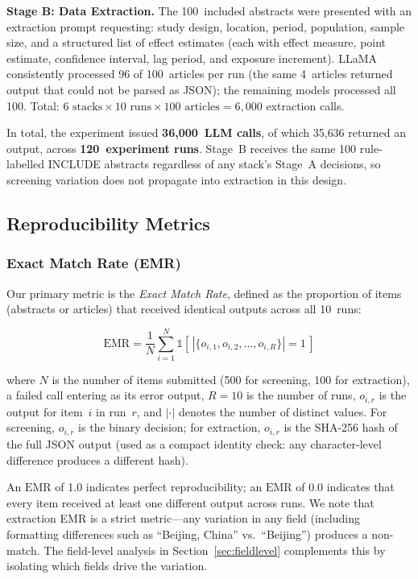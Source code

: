 \documentclass[preprint,review,12pt,authoryear]{elsarticle}
\newcommand{\emr}{\textrm{EMR}}
\begin{document}
\textbf{Stage B: Data Extraction.}
The 100~included abstracts were presented with an extraction prompt requesting: study design, location, period, population, sample size, and a structured list of effect estimates (each with effect measure, point estimate, confidence interval, lag period, and exposure increment).
LLaMA consistently processed 96 of 100~articles per run (the same 4~articles returned output that could not be parsed as JSON); the remaining models processed all 100.
Total: $6 \text{ stacks} \times 10 \text{ runs} \times 100 \text{ articles} = 6{,}000$ extraction calls.

In total, the experiment issued \textbf{36{,}000~LLM calls}, of which 35{,}636 returned an output, across \textbf{120~experiment runs}. Stage~B receives the same 100 rule-labelled INCLUDE abstracts regardless of any stack's Stage~A decisions, so screening variation does not propagate into extraction in this design.

\subsection{Reproducibility Metrics}

\subsubsection{Exact Match Rate (EMR)}
\label{sec:metrics_emr}

Our primary metric is the \emph{Exact Match Rate}, defined as the proportion of items (abstracts or articles) that received identical outputs across all 10~runs:

\begin{equation}
  \emr = \frac{1}{N} \sum_{i=1}^{N} \mathbb{1}\!\left[\,\left|\{o_{i,1}, o_{i,2}, \ldots, o_{i,R}\}\right| = 1\,\right]
\end{equation}

\noindent where $N$ is the number of items submitted (500 for screening, 100 for extraction), a failed call entering as its error output, $R{=}10$ is the number of runs, $o_{i,r}$ is the output for item~$i$ in run~$r$, and $|\cdot|$ denotes the number of distinct values.
For screening, $o_{i,r}$ is the binary decision; for extraction, $o_{i,r}$ is the SHA-256 hash of the full JSON output (used as a compact identity check: any character-level difference produces a different hash).

An $\emr$ of 1.0 indicates perfect reproducibility; an $\emr$ of 0.0 indicates that every item received at least one different output across runs.
We note that extraction EMR is a strict metric---any variation in any field (including formatting differences such as ``Beijing, China'' vs.\ ``Beijing'') produces a non-match.
The field-level analysis in Section~\ref{sec:fieldlevel} complements this by isolating which fields drive the variation.
\end{document}
